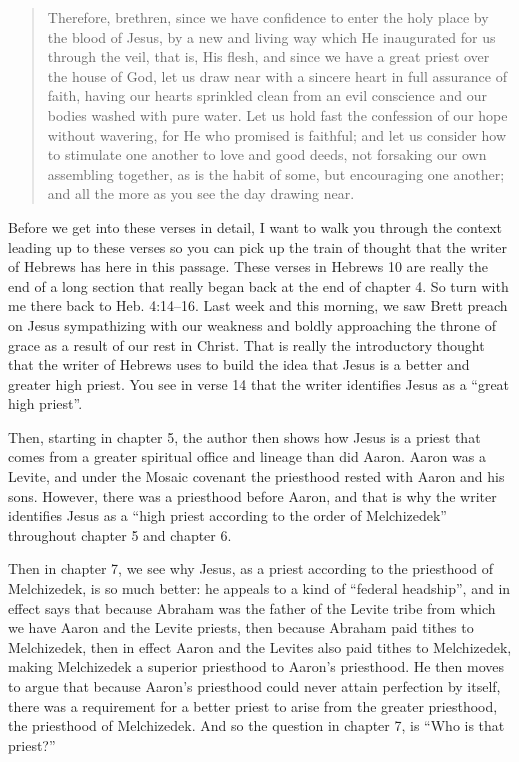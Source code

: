 \documentclass[letterpaper, 12pt]{article}
\begin{document}
    \begin{quote}

        Therefore, brethren, since we have confidence to enter the holy
        place by the blood of Jesus, by a new and living way which He
        inaugurated for us through the veil, that is, His flesh, and
        since we have a great priest over the house of God, let us draw
        near with a sincere heart in full assurance of faith, having our
        hearts sprinkled clean from an evil conscience and our bodies
        washed with pure water. Let us hold fast the confession of our
        hope without wavering, for He who promised is faithful; and let
        us consider how to stimulate one another to love and good deeds,
        not forsaking our own assembling together, as is the habit of
        some, but encouraging one another; and all the more as you see
        the day drawing near.

    \end{quote}

    Before we get into these verses in detail, I want to walk you
    through the context leading up to these verses so you can pick up
    the train of thought that the writer of Hebrews has here in this
    passage. These verses in Hebrews 10 are really the end of a long
    section that really began back at the end of chapter 4. So turn with
    me there back to Heb. 4:14--16. Last week and this morning, we saw
    Brett preach on Jesus sympathizing with our weakness and boldly
    approaching the throne of grace as a result of our rest in Christ.
    That is really the introductory thought that the writer of Hebrews
    uses to build the idea that Jesus is a better and greater high
    priest. You see in verse 14 that the writer identifies Jesus as a
    ``great high priest''.  

    Then, starting in chapter 5, the author then shows how Jesus is a
    priest that comes from a greater spiritual office and lineage than
    did Aaron. Aaron was a Levite, and under the Mosaic covenant the
    priesthood rested with Aaron and his sons. However, there was a
    priesthood before Aaron, and that is why the writer identifies Jesus
    as a ``high priest according to the order of Melchizedek''
    throughout chapter 5 and chapter 6.

    Then in chapter 7, we see why Jesus, as a priest according to the
    priesthood of Melchizedek, is so much better: he appeals to a kind
    of ``federal headship'', and in effect says that because Abraham was
    the father of the Levite tribe from which we have Aaron and the
    Levite priests, then because Abraham paid tithes to Melchizedek,
    then in effect Aaron and the Levites also paid tithes to
    Melchizedek, making Melchizedek a superior priesthood to Aaron's
    priesthood. He then moves to argue that because Aaron's priesthood could never
    attain perfection by itself, there was a requirement for a better
    priest to arise from the greater priesthood, the priesthood of
    Melchizedek. And so the question in chapter 7, is ``Who is that
    priest?''
\end{document}
